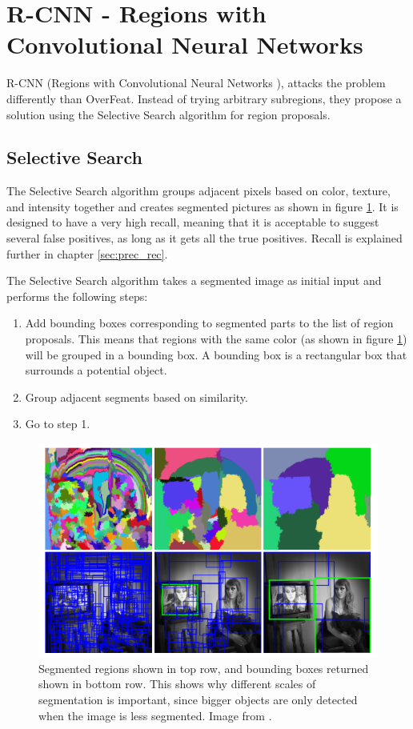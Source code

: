 \section{R-CNN - Regions with Convolutional Neural Networks }
R-CNN (Regions with Convolutional Neural Networks  \citep{R-CNN}), attacks the problem differently than OverFeat. Instead of trying arbitrary subregions, they propose a solution using the Selective Search algorithm for region proposals.

\subsection{Selective Search }
The Selective Search algorithm \citep{SelSearch} groups adjacent pixels based on color, texture, and intensity together and creates segmented pictures as shown in figure \ref{fig:sel_serach}. It is designed to have a very high recall, meaning that it is acceptable to suggest several false positives, as long as it gets all the true positives. Recall is explained further in chapter \ref{sec:prec_rec}.

\vspace{3mm}

The Selective Search algorithm takes a segmented image as initial input and performs the following steps:
\begin{enumerate}
  \item Add bounding boxes corresponding to segmented parts to the list of region proposals. This means that regions with the same color (as shown in figure \ref{fig:sel_serach}) will be grouped in a bounding box. A bounding box is a rectangular box that surrounds a potential object.
  \item Group adjacent segments based on similarity.
  \item Go to step 1.
\end{enumerate}

\begin{figure}[h!]
    \centering
    \includegraphics[scale=0.5]{fig/sel_search.png}
    \caption{Segmented regions shown in top row, and bounding boxes returned shown in bottom row. This shows why different scales of segmentation is important, since bigger objects are only detected when the image is less segmented. Image from \citep{SelSearch}.}
    \label{fig:sel_serach}
\end{figure}





